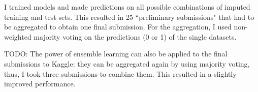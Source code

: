 I trained models and made predictions on all possible combinations of imputed training and test sets. This resulted in 25 ``preliminary submissions" that had to be aggregated to obtain one final submission. For the aggregation, I used non-weighted majority voting on the predictions (0 or 1) of the single datasets.

TODO:
The power of ensemble learning can also be applied to the final submissions to Kaggle: they can be aggregated again by using majority voting, thus, I took three submissions to combine them. This resulted in a slightly improved performance.